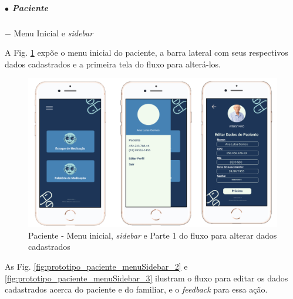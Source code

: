 \subparagraph*{$\bullet$ Paciente} \hfill
\subparagraph*{} $-$ Menu Inicial e \textit{sidebar}

A Fig. \ref{fig:prototipo_paciente_menuSidebar_1} expõe o menu inicial do paciente, a barra lateral com seus respectivos dados cadastrados e a primeira tela do fluxo para alterá-los.

\begin{figure}[H]
    \centering
    \includegraphics[width=15cm]{figuras/software/Atual_prototipo/Paciente_menuSidebar_1.png}
    \caption{Paciente - Menu inicial, \textit{sidebar} e Parte 1 do fluxo para alterar dados cadastrados}
    \label{fig:prototipo_paciente_menuSidebar_1}
\end{figure}

As Fig. \ref{fig:prototipo_paciente_menuSidebar_2} e \ref{fig:prototipo_paciente_menuSidebar_3} ilustram o fluxo para editar os dados cadastrados acerca do paciente e do familiar, e o \textit{feedback} para essa ação.

